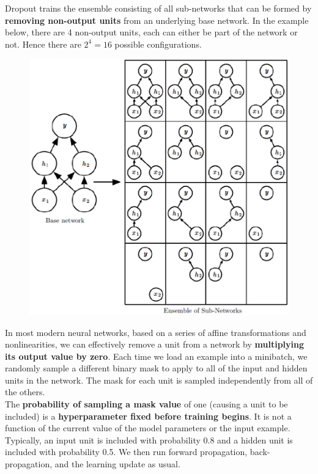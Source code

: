 \begin{multicols}{2}
	Dropout trains the ensemble consisting of all sub-networks that can be formed by \textbf{removing non-output units} from an underlying base network.
	In the example below, there are 4 non-output units, each can either be part of the network or not. Hence there are $2^4=16$ possible configurations.
	\begin{figure}[H]
		\centering
		\includegraphics[width=0.9\linewidth]{images/dropoutensemble.png}
	\end{figure}
	In most modern neural networks, based on a series of affine transformations and nonlinearities, we can effectively remove a unit from a network by \textbf{multiplying its output value by zero}.
	Each time we load an example into a minibatch, we randomly sample a different binary mask to apply to all of the input and hidden units in the network. The mask for each unit is sampled independently from all of the others.\\
	
	The \textbf{probability of sampling a mask value} of one (causing a unit to be included) is a \textbf{hyperparameter fixed before training begins}. It is not a function of the current value of the model parameters or the input example. 
	Typically, an input unit is included with probability 0.8 and a hidden unit is included with probability 0.5. We then run forward propagation, back-propagation, and the learning update as usual.\\
	

\end{multicols}
